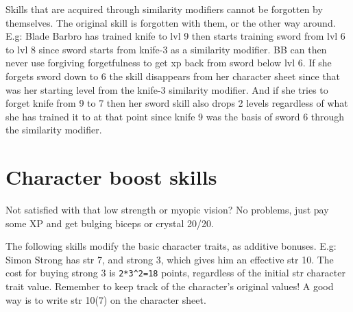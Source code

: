 Skills that are acquired through similarity modifiers cannot be forgotten by themselves. The original skill is forgotten with them, or the other way around.
E.g: Blade Barbro has trained knife to lvl 9 then starts training sword from lvl 6 to lvl 8 since sword starts from knife-3 as a similarity modifier. BB can then never use forgiving forgetfulness to get xp back from sword below lvl 6. If she forgets sword down to 6 the skill disappears from her character sheet since that was her starting level from the knife-3 similarity modifier.
And if she tries to forget knife from 9 to 7 then her sword skill also drops 2 levels regardless of what she has trained it to at that point since knife 9 was the basis of sword 6 through the similarity modifier.



\closeskillslist

















\section*{Character boost skills}

Not satisfied with that low strength or myopic vision? No problems, just pay some XP and get bulging biceps or crystal 20/20.

The following skills modify the basic character traits, as additive bonuses.
E.g: Simon Strong has str 7, and strong 3, which gives him an effective str 10.
The cost for buying strong 3 is \verb|2*3^2=18| points, regardless of the initial str character trait value. Remember to keep track of the character's original values! A good way is to write str 10(7) on the character sheet.


\openskillslist

